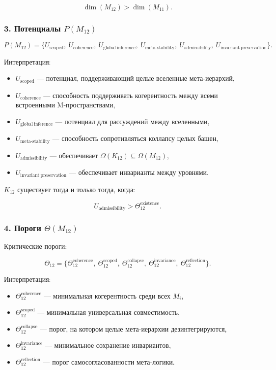 \[
\dim(M_{12}) > \dim(M_{11}).
\]

\subsubsection*{3. Потенциалы $P(M_{12})$}

\[
P(M_{12}) =
\{
U_{\mathrm{scoped}},\
U_{\mathrm{coherence}},\
U_{\mathrm{global\ inference}},\
U_{\mathrm{meta\mbox{-}stability}},\
U_{\mathrm{admissibility}},\
U_{\mathrm{invariant\ preservation}}
\}.
\]

Интерпретация:

\begin{itemize}
    \item $U_{\mathrm{scoped}}$ — потенциал, поддерживающий целые вселенные мета-иерархий,
    \item $U_{\mathrm{coherence}}$ — способность поддерживать когерентность между всеми встроенными M-пространствами,
    \item $U_{\mathrm{global\ inference}}$ — потенциал для рассуждений между вселенными,
    \item $U_{\mathrm{meta\mbox{-}stability}}$ — способность сопротивляться коллапсу целых башен,
    \item $U_{\mathrm{admissibility}}$ — обеспечивает $\Omega(K_{12})\subseteq\Omega(M_{12})$,
    \item $U_{\mathrm{invariant\ preservation}}$ — обеспечивает инварианты между уровнями.
\end{itemize}

$K_{12}$ существует тогда и только тогда, когда:

\[
U_{\mathrm{admissibility}} > \Theta_{12}^{\mathrm{existence}}.
\]

\subsubsection*{4. Пороги $\Theta(M_{12})$}

Критические пороги:

\[
\Theta_{12}=
\{
\Theta_{12}^{\mathrm{coherence}},\
\Theta_{12}^{\mathrm{scoped}},\
\Theta_{12}^{\mathrm{collapse}},\
\Theta_{12}^{\mathrm{invariance}},\
\Theta_{12}^{\mathrm{reflection}}
\}.
\]

Интерпретация:

\begin{itemize}
    \item $\Theta_{12}^{\mathrm{coherence}}$ — минимальная когерентность среди всех $M_i$,
    \item $\Theta_{12}^{\mathrm{scoped}}$ — минимальная универсальная совместимость,
    \item $\Theta_{12}^{\mathrm{collapse}}$ — порог, на котором целые мета-иерархии дезинтегрируются,
    \item $\Theta_{12}^{\mathrm{invariance}}$ — минимальное сохранение инвариантов,
    \item $\Theta_{12}^{\mathrm{reflection}}$ — порог самосогласованности мета-логики.
\end{itemize}

